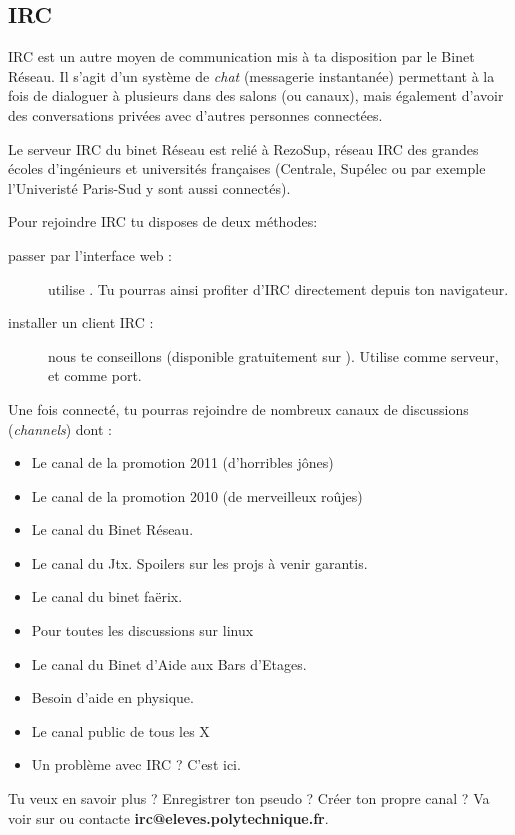 
\subsection{IRC}

\label{irc}

IRC est un autre moyen de communication mis à ta disposition par le Binet Réseau. Il s'agit d'un système de \emph{chat} (messagerie instantanée) permettant à la fois de dialoguer à plusieurs dans des salons (ou canaux), mais également d'avoir des conversations privées avec d'autres personnes connectées.


Le serveur IRC du binet Réseau est relié à RezoSup, réseau IRC des grandes écoles d'ingénieurs et universités françaises (Centrale, Supélec ou par exemple l'Univeristé Paris-Sud y sont aussi connectés).

Pour rejoindre IRC tu disposes de deux méthodes:

                  
\begin{description}
  \item[passer par l'interface web :] utilise . Tu pourras ainsi profiter d'IRC directement depuis ton navigateur.
  \item[installer un client IRC :] nous te conseillons  (disponible gratuitement sur ). Utilise   comme serveur, et  comme port.
\end{description}

 
Une fois connecté, tu pourras rejoindre de nombreux canaux de discussions (\emph{channels}) dont :
\begin{itemize}
  \item {} Le canal de la promotion 2011 (d'horribles jônes)
  \item {} Le canal de la promotion 2010 (de merveilleux roûjes)
  \item {} Le canal du Binet Réseau.
  \item {} Le canal du Jtx. Spoilers sur les projs à venir garantis.
  \item {} Le canal du binet fa\"erix.
  \item {} Pour toutes les discussions sur linux
  \item {} Le canal du Binet d'Aide aux Bars d'Etages.
  \item {} Besoin d'aide en physique.
  \item {} Le canal public de tous les X
  \item {} Un problème avec IRC ? C'est ici.
\end{itemize}

 Tu veux en savoir plus ? Enregistrer ton pseudo ? Créer ton propre canal ? Va voir sur  ou contacte \textbf{irc@eleves.polytechnique.fr}.


